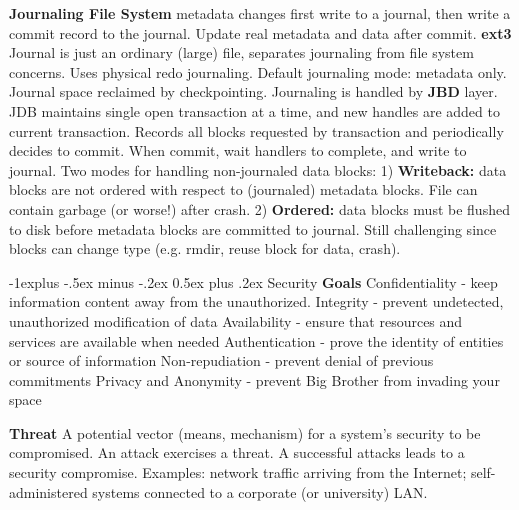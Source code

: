 \documentclass[6pt,landscape]{article}
\makeatletter
\renewcommand{\subsection}{\@startsection{subsection}{2}{0mm}%
                                {-1explus -.5ex minus -.2ex}%
                                {0.5ex plus .2ex}%
                                {\normalfont\normalsize\bfseries}}
\makeatother
\begin{document}
\begin{multicols}{3}
{\bf Journaling File System} metadata changes first write to a journal, then write a commit record to the journal. Update real metadata and data after commit.
{\bf ext3} Journal is just an ordinary (large) file, separates journaling from file system concerns. Uses physical redo journaling. Default journaling mode: metadata only. Journal space reclaimed by checkpointing.
Journaling is handled by {\bf JBD} layer. JDB maintains single open transaction at a time, and new handles are added to current transaction. Records all blocks requested by transaction and periodically decides to commit. When commit, wait handlers to complete, and write to journal.
Two modes for handling non-journaled data blocks: 1) {\bf Writeback:} data blocks are not ordered with respect to (journaled) metadata blocks. File can contain garbage (or worse!) after crash.
2) {\bf Ordered:} data blocks must be flushed to disk before metadata blocks are committed to journal. Still challenging since blocks can change type (e.g. rmdir, reuse block for data, crash).



\subsection{Security}
{\bf Goals} Confidentiality - keep information content away from the unauthorized.
Integrity - prevent undetected, unauthorized modification of data
Availability - ensure that resources and services are available when needed
Authentication - prove the identity of entities or source of information
Non-repudiation - prevent denial of previous commitments
Privacy and Anonymity - prevent Big Brother from invading your space

{\bf Threat} A potential vector (means, mechanism) for a system’s security to be compromised. An attack exercises a threat. A successful attacks leads to a security compromise. Examples: network traffic arriving from the Internet; self-administered systems connected to a corporate (or university) LAN.


\end{multicols}
\end{document}
